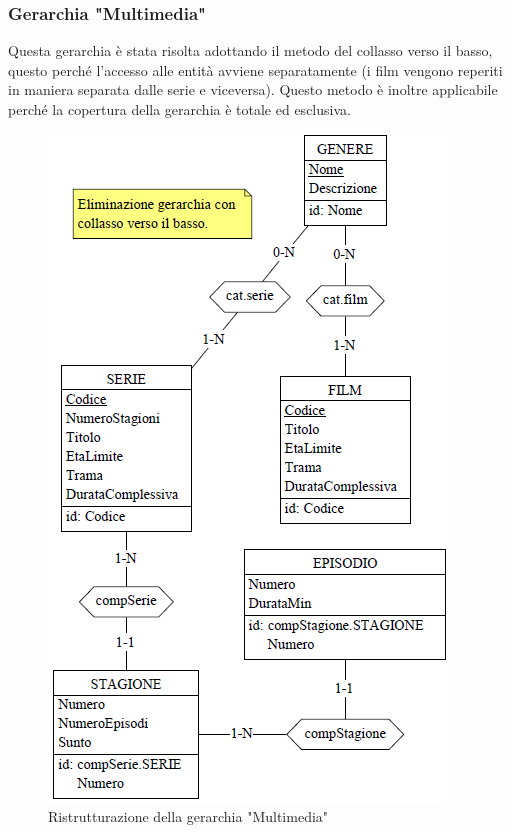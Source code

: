 \documentclass[a4paper,12pt]{report}
\begin{document}
	\subsubsection{	Gerarchia "Multimedia"}
	Questa gerarchia è stata risolta adottando il metodo del collasso verso il basso, questo perché l'accesso alle entità avviene separatamente (i film vengono reperiti in maniera separata dalle serie e viceversa). Questo metodo è inoltre applicabile perché la copertura della gerarchia è totale ed esclusiva.
	\begin{figure}[H]
		\centering
		\includegraphics{ER/ristrutturazione/ristmultimedia.png}
		\caption{Ristrutturazione della gerarchia "Multimedia"}
	\end{figure}
\end{document}
